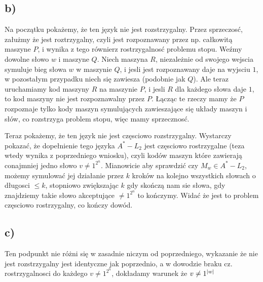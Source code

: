 \documentclass[11pt]{scrartcl}
\begin{document}
          \subsection{b)}

            Na początku pokażemy, że ten język nie jest rozstrzygalny.
            Przez sprzeczosć, załużmy że jest roztrzygalny, czyli jest rozpoznawany przez np. całkowitą maszyne $P$, i wynika z tego równierz rostrzygalnosć problemu stopu.
            Weźmy dowolne słowo $w$ i maszyne $Q$. Niech maszyna $R$, niezależnie od swojego wejscia symuluje bieg słowa $w$ w maszynie $Q$, i jesli jest rozpoznawany daje na wyjsciu $1$, w pozostałym przypadku niech się zawiesza (podobnie jak $Q$). Ale teraz uruchamiamy kod maszyny $R$ na maszynie $P$, i jesli $R$ dla każdego słowa daje $1$, to kod maszyny nie jest rozpoznawalny przez $P$. Łącząc te rzeczy mamy że $P$ rozpoznaje tylko kody maszyn symulujących zawieszające się układy maszyn i słów, co rozstrzyga problem stopu, więc mamy sprzecznosć.

            Teraz pokażemy, że ten język nie jest częsciowo rozstrzygalny.
            Wystarczy pokazać, że dopełnienie tego języka $A^* - L_2$ jest częsciowo rostrzygalne (teza wtedy wynika z poprzedniego wniosku), czyli kodów maszyn które zawierają conajmniej jedno słowo $v \not = 1^{2^n}$. Mianowicie aby sprawdzić czy $M_w \in A^* - L_2$, możemy symulować jej działanie przez $k$ kroków na kolejno wszystkich słowach o długosci $\leq k$, stopniowo zwiększając $k$ gdy skończą nam sie słowa, gdy znajdziemy takie słowo akceptujące $\not = 1^{2^n}$ to kończymy. Widać że jest to problem częsciowo rostrzygalny, co kończy dowód.

            \subsection{c)}
            
            Ten podpunkt nie różni się w zasadnie niczym od poprzedniego, wykazanie że nie jest rozstrzygalny jest identyczne jak poprzednio, a w dowodzie braku cz. rostrzygalnosci do każdego $v \not = 1^{2^n}$, dokładamy warunek że $v \not = 1^{\left\lvert w \right\rvert }$ 
\end{document}
